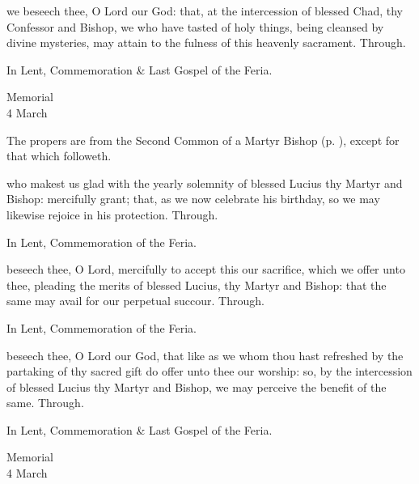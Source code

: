 \postcommunion
{} we beseech thee, O Lord our God: that, at the intercession of blessed Chad, thy Confessor and Bishop, we who have tasted of holy things, being cleansed by divine mysteries, may attain to the fulness of this heavenly sacrament. Through.

\begin{rubric}
	In Lent, Commemoration \& Last Gospel of the Feria.
\end{rubric}


\begin{inhead}
    {Memorial\\
4 March}
\end{inhead}

\begin{rubric}
	The propers are from the Second Common of a Martyr Bishop (p. \pageref{CommonMartyrBishopII}), except for that which followeth.
\end{rubric}

\collect
{} who makest us glad with the yearly solemnity of blessed Lucius thy Martyr and Bishop: mercifully grant; that, as we now celebrate his birthday, so we may likewise rejoice in his protection. Through.

\begin{rubric}
	In Lent, Commemoration of the Feria.
\end{rubric}

\secret
{} beseech thee, O Lord, mercifully to accept this our sacrifice, which we offer unto thee, pleading the merits of blessed Lucius, thy Martyr and Bishop: that the same may avail for our perpetual succour. Through.

\begin{rubric}
	In Lent, Commemoration of the Feria.
\end{rubric}

\postcommunion
{} beseech thee, O Lord our God, that like as we whom thou hast refreshed by the partaking of thy sacred gift do offer unto thee our worship: so, by the intercession of blessed Lucius thy Martyr and Bishop, we may perceive the benefit of the same. Through.

\begin{rubric}
	In Lent, Commemoration \& Last Gospel of the Feria.
\end{rubric}


\begin{inhead}
    {Memorial\\
4 March}
\end{inhead}

